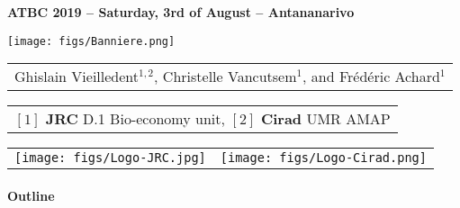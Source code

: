 {

  \begin{frame}
    \begin{center}
        \small{\textbf{ATBC 2019 -- Saturday, 3rd of August -- Antananarivo}}
    \end{center}
    \vspace{-0.5cm}
    \titlepage %
    \vspace{-2.5cm}
    \begin{center}
      \texttt{[image: figs/Banniere.png]}
    \end{center}
    \begin{center}

        \begin{tabular}{c}
          Ghislain Vieilledent$^{1,2}$, Christelle Vancutsem$^{1}$, and Frédéric Achard$^{1}$
        \end{tabular}

      \vspace{0.25cm}

      {\small
        \begin{tabular}{c}
          $[1]$ \textbf{JRC} D.1 Bio-economy unit,
          $[2]$ \textbf{Cirad} UMR AMAP
        \end{tabular}
      }

      \vspace{0.25cm}

      \begin{tabular}{C{3cm}C{3cm}}
        \texttt{[image: figs/Logo-JRC.jpg]} &
        \texttt{[image: figs/Logo-Cirad.png]}\\
      \end{tabular}

    \end{center}
    
  \end{frame}
}
\setcounter{framenumber}{0}


\placelogotrue
\begin{frame}
  \framesubtitle{Outline}
  \begin{columns}[c]
    \begin{column}{0.5\textwidth}
      \tableofcontents[sections={1-2}]
    \end{column}
    \begin{column}{0.5\textwidth}
      \tableofcontents[sections={3-5}]
    \end{column}
  \end{columns}
\end{frame}
\placelogofalse